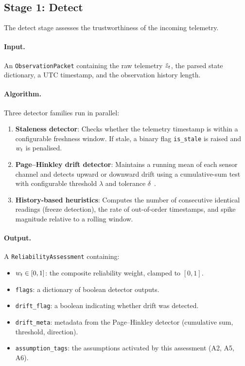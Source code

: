 \subsection{Stage 1: Detect}\label{sec:detect}

The detect stage assesses the trustworthiness of the incoming telemetry.

\paragraph{Input.}  An \texttt{ObservationPacket} containing the raw telemetry
$\tilde{z}_t$, the parsed state dictionary, a UTC timestamp, and the observation
history length.

\paragraph{Algorithm.}  Three detector families run in parallel:
\begin{enumerate}[nosep]
  \item \textbf{Staleness detector}: Checks whether the telemetry timestamp is
        within a configurable freshness window.  If stale, a binary flag
        \texttt{is\_stale} is raised and $w_t$ is penalised.
  \item \textbf{Page--Hinkley drift detector}: Maintains a running mean of each
        sensor channel and detects upward or downward drift using a cumulative-sum
        test with configurable threshold $\lambda$ and tolerance
        $\delta$~\cite{page1954continuous,hinkley1971inference}.
  \item \textbf{History-based heuristics}: Computes the number of consecutive
        identical readings (freeze detection), the rate of out-of-order timestamps,
        and spike magnitude relative to a rolling window.
\end{enumerate}

\paragraph{Output.}  A \texttt{ReliabilityAssessment} containing:
\begin{itemize}[nosep]
  \item $w_t \in [0,1]$: the composite reliability weight, clamped to $[0,1]$.
  \item \texttt{flags}: a dictionary of boolean detector outputs.
  \item \texttt{drift\_flag}: a boolean indicating whether drift was detected.
  \item \texttt{drift\_meta}: metadata from the Page--Hinkley detector
        (cumulative sum, threshold, direction).
  \item \texttt{assumption\_tags}: the assumptions activated by this assessment
        (A2, A5, A6).
\end{itemize}


